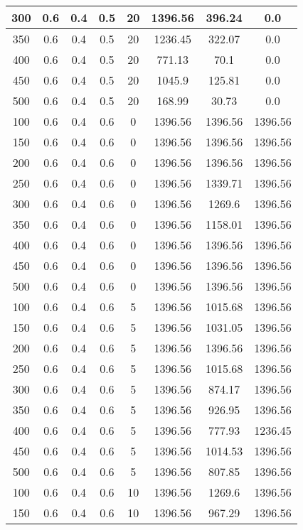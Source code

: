 \documentclass[a4paper, 12pt]{extreport}
\begin{document}
\begin{itemize}
\begin{longtable}{|c|c|c|c|c|c|c|c|}
			300 & 0.6 & 0.4 & 0.5 & 20 & 1396.56 & 396.24 & 0.0 \\\hline
			350 & 0.6 & 0.4 & 0.5 & 20 & 1236.45 & 322.07 & 0.0 \\\hline
			400 & 0.6 & 0.4 & 0.5 & 20 & 771.13 & 70.1 & 0.0 \\\hline
			450 & 0.6 & 0.4 & 0.5 & 20 & 1045.9 & 125.81 & 0.0 \\\hline
			500 & 0.6 & 0.4 & 0.5 & 20 & 168.99 & 30.73 & 0.0 \\\hline
			100 & 0.6 & 0.4 & 0.6 & 0 & 1396.56 & 1396.56 & 1396.56 \\\hline
			150 & 0.6 & 0.4 & 0.6 & 0 & 1396.56 & 1396.56 & 1396.56 \\\hline
			200 & 0.6 & 0.4 & 0.6 & 0 & 1396.56 & 1396.56 & 1396.56 \\\hline
			250 & 0.6 & 0.4 & 0.6 & 0 & 1396.56 & 1339.71 & 1396.56 \\\hline
			300 & 0.6 & 0.4 & 0.6 & 0 & 1396.56 & 1269.6 & 1396.56 \\\hline
			350 & 0.6 & 0.4 & 0.6 & 0 & 1396.56 & 1158.01 & 1396.56 \\\hline
			400 & 0.6 & 0.4 & 0.6 & 0 & 1396.56 & 1396.56 & 1396.56 \\\hline
			450 & 0.6 & 0.4 & 0.6 & 0 & 1396.56 & 1396.56 & 1396.56 \\\hline
			500 & 0.6 & 0.4 & 0.6 & 0 & 1396.56 & 1396.56 & 1396.56 \\\hline
			100 & 0.6 & 0.4 & 0.6 & 5 & 1396.56 & 1015.68 & 1396.56 \\\hline
			150 & 0.6 & 0.4 & 0.6 & 5 & 1396.56 & 1031.05 & 1396.56 \\\hline
			200 & 0.6 & 0.4 & 0.6 & 5 & 1396.56 & 1396.56 & 1396.56 \\\hline
			250 & 0.6 & 0.4 & 0.6 & 5 & 1396.56 & 1015.68 & 1396.56 \\\hline
			300 & 0.6 & 0.4 & 0.6 & 5 & 1396.56 & 874.17 & 1396.56 \\\hline
			350 & 0.6 & 0.4 & 0.6 & 5 & 1396.56 & 926.95 & 1396.56 \\\hline
			400 & 0.6 & 0.4 & 0.6 & 5 & 1396.56 & 777.93 & 1236.45 \\\hline
			450 & 0.6 & 0.4 & 0.6 & 5 & 1396.56 & 1014.53 & 1396.56 \\\hline
			500 & 0.6 & 0.4 & 0.6 & 5 & 1396.56 & 807.85 & 1396.56 \\\hline
			100 & 0.6 & 0.4 & 0.6 & 10 & 1396.56 & 1269.6 & 1396.56 \\\hline
			150 & 0.6 & 0.4 & 0.6 & 10 & 1396.56 & 967.29 & 1396.56 \\\hline

\end{longtable}
\end{itemize}
\end{document}
